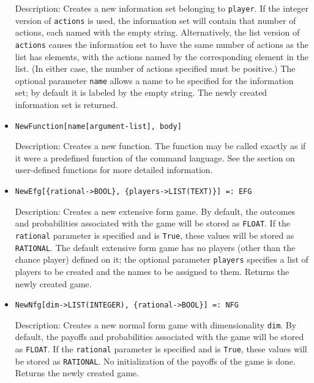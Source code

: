 \begin{itemize}
\bd
\item
[Description:] Creates a new information set belonging to \verb+player+.
If the integer version of \verb+actions+ is used, the information set
will contain that number of actions, each named with the empty string.
Alternatively, the list version of \verb+actions+ causes the information
set to have the same number of actions as the list has elements, with
the actions named by the corresponding element in the list.  (In either
case, the number of actions specified must be positive.)  The optional
parameter \verb+name+ allows a name to be specified for the information
set; by default it is labeled by the empty string.  The newly created
information set is returned.
\ed

\item   
\protect \large \begin{verbatim}
NewFunction[name[argument-list], body]
\end{verbatim}\normalsize

\bd
\item
[Description:] Creates a new function.  The function may be called exactly
as if it were a predefined function of the command language.  See the
section on user-defined functions for more detailed information.
\ed

\item
\protect \large \begin{verbatim} 
NewEfg[{rational->BOOL}, {players->LIST(TEXT)}] =: EFG
\end{verbatim}\normalsize

\bd
\item
[Description:] Creates a new extensive form game.  By default, the
outcomes and probabilities associated with the game will be stored as
{\tt FLOAT}.  If the \verb+rational+ parameter is specified and is \verb+True+,
these values will be stored as {\tt RATIONAL}.  The default extensive form
game has no players (other than the chance player) defined on it; the
optional parameter \verb+players+ specifies a list of players to be
created and the names to be assigned to them.  Returns the newly created
game.
\ed

\item
\protect \large \begin{verbatim}
NewNfg[dim->LIST(INTEGER), {rational->BOOL}] =: NFG
\end{verbatim}\normalsize

\bd
\item
[Description:] Creates a new normal form game with dimensionality \verb+dim+.
By default, the payoffs and probabilities associated with the game will
be stored as {\tt FLOAT}.  If the \verb+rational+ parameter is specified
and is \verb+True+, these values will be stored as {\tt RATIONAL}.
No initialization of the payoffs of the game is done.
Returns the newly created game.
\ed


\end{itemize}
